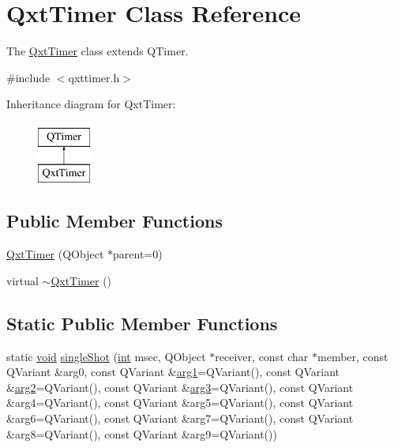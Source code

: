 \hypertarget{class_qxt_timer}{\section{Qxt\-Timer Class Reference}
\label{class_qxt_timer}
}


The \hyperlink{class_qxt_timer}{Qxt\-Timer} class extends Q\-Timer.  




{\ttfamily \#include $<$qxttimer.\-h$>$}

Inheritance diagram for Qxt\-Timer\-:\begin{figure}[H]
\begin{center}
\leavevmode
\includegraphics[height=2.000000cm]{class_qxt_timer}
\end{center}
\end{figure}
\subsection*{Public Member Functions}
\begin{DoxyCompactItemize}
\item 
\hyperlink{class_qxt_timer_af7a6f541fea58707b817890b1bdf2275}{Qxt\-Timer} (Q\-Object $\ast$parent=0)
\item 
virtual \hyperlink{class_qxt_timer_aa65541fc9209f45486e74c80c672a54a}{$\sim$\-Qxt\-Timer} ()
\end{DoxyCompactItemize}
\subsection*{Static Public Member Functions}
\begin{DoxyCompactItemize}
\item 
static \hyperlink{group___u_a_v_objects_plugin_ga444cf2ff3f0ecbe028adce838d373f5c}{void} \hyperlink{class_qxt_timer_aa9521c587578b0f92821823a706ce362}{single\-Shot} (\hyperlink{ioapi_8h_a787fa3cf048117ba7123753c1e74fcd6}{int} msec, Q\-Object $\ast$receiver, const char $\ast$member, const Q\-Variant \&arg0, const Q\-Variant \&\hyperlink{glext_8h_a4b247ab422408c1761a36f9034c2585b}{arg1}=Q\-Variant(), const Q\-Variant \&\hyperlink{glext_8h_a5aee5a44bf92a9837fea48e41ef0df57}{arg2}=Q\-Variant(), const Q\-Variant \&\hyperlink{glext_8h_a525a52cc20e1aa70741e5c7dae172f25}{arg3}=Q\-Variant(), const Q\-Variant \&arg4=Q\-Variant(), const Q\-Variant \&arg5=Q\-Variant(), const Q\-Variant \&arg6=Q\-Variant(), const Q\-Variant \&arg7=Q\-Variant(), const Q\-Variant \&arg8=Q\-Variant(), const Q\-Variant \&arg9=Q\-Variant())
\end{DoxyCompactItemize}


